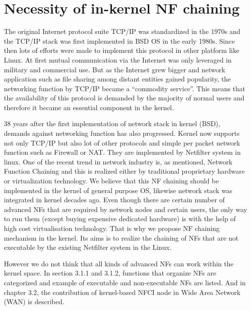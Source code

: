 \section{Necessity of in-kernel NF chaining}
The original Internet protocol suite TCP/IP was standardized in the 1970s and the TCP/IP stack was first implemented in BSD OS in the early 1980s. Since then lots of efforts were made to implement this protocol in other platform like Linux. At first mutual communication via the Internet was only leveraged in military and commercial use. But as the Internet grew bigger and network application such as file sharing among distant entities gained popularity, the networking function by TCP/IP became a “commodity service”. This means that the availability of this protocol is demanded by the majority of normal users and therefore it became an essential component in the kernel. 

 38 years after the first implementation of network stack in kernel (BSD), demands against networking function has also progressed. Kernel now supports not only TCP/IP but also lot of other protocols and simple per packet network function such as Firewall or NAT. They are implemented by Netfilter system in linux. One of the recent trend in network industry is, as mentioned, Network Function Chaining and this is realized either by traditional proprietary hardware or virtualization technology. We believe that this NF chaining should be implemented in the kernel of general purpose OS, likewise network stack was integrated in kernel decades ago. Even though there are certain number of advanced NFs that are required by network nodes and certain users, the only way to run them (except buying expensive dedicated hardware) is with the help of high cost virtualisation technology. That is why we propose NF chaining mechanism in the kernel. Its aims is to realize the chaining of NFs that are not executable by the existing Netfilter system in the Linux. 
 
 However we do not think that all kinds of advanced NFs can work within the kernel space. In section 3.1.1 and 3.1.2, functions that organize NFs are categorized and example of executable and non-executable NFs are listed. And in chapter 3.2, the contribution of kernel-based NFCI node in Wide Area Network (WAN) is described. 
 
